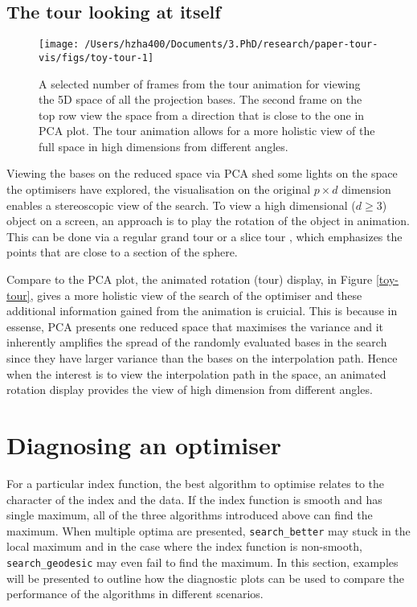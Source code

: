 \documentclass[12pt]{article}
\begin{document}
\hypertarget{the-tour-looking-at-itself}{%
\subsection{The tour looking at itself}\label{the-tour-looking-at-itself}}

\begin{figure}

{\centering \texttt{[image: /Users/hzha400/Documents/3.PhD/research/paper-tour-vis/figs/toy-tour-1]} 

}

\caption{A selected number of frames from the tour animation for viewing the 5D space of all the projection bases. The second frame on the top row view the space from a direction that is close to the one in PCA plot. The tour animation allows for a more holistic view of the full space in high dimensions from different angles.}\label{fig:toy-tour}
\end{figure}



Viewing the bases on the reduced space via PCA shed some lights on the space the optimisers have explored, the visualisation on the original \(p \times d\) dimension enables a stereoscopic view of the search. To view a high dimensional (\(d \ge 3\)) object on a screen, an approach is to play the rotation of the object in animation. This can be done via a regular grand tour or a slice tour \citep{laa2020slice}, which emphasizes the points that are close to a section of the sphere.

Compare to the PCA plot, the animated rotation (tour) display, in Figure \ref{toy-tour}, gives a more holistic view of the search of the optimiser and these additional information gained from the animation is cruicial. This is because in essense, PCA presents one reduced space that maximises the variance and it inherently amplifies the spread of the randomly evaluated bases in the search since they have larger variance than the bases on the interpolation path. Hence when the interest is to view the interpolation path in the space, an animated rotation display provides the view of high dimension from different angles.

\hypertarget{application}{%
\section{Diagnosing an optimiser}\label{application}}

For a particular index function, the best algorithm to optimise relates to the character of the index and the data. If the index function is smooth and has single maximum, all of the three algorithms introduced above can find the maximum. When multiple optima are presented, \texttt{search\_better} may stuck in the local maximum and in the case where the index function is non-smooth, \texttt{search\_geodesic} may even fail to find the maximum. In this section, examples will be presented to outline how the diagnostic plots can be used to compare the performance of the algorithms in different scenarios.
\end{document}
